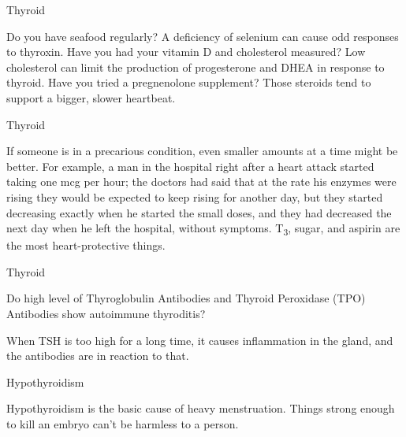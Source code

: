 \documentclass[11pt,oneside,openany,extrafontsizes]{memoir}
\begin{document}
\begin{standalonequote}{Thyroid}

    \begin{answer}
        Do you have seafood regularly? A deficiency of selenium can cause odd responses to thyroxin. Have you had your vitamin D and cholesterol measured? Low cholesterol can limit the production of progesterone and DHEA in response to thyroid. Have you tried a pregnenolone supplement? Those steroids tend to support a bigger, slower heartbeat.
    \end{answer}
\end{standalonequote}

\begin{standalonequote}{Thyroid}

    \begin{answer}
        If someone is in a precarious condition, even smaller amounts at a time might be better. For example, a man in the hospital right after a heart attack started taking one mcg per hour; the doctors had said that at the rate his enzymes were rising they would be expected to keep rising for another day, but they started decreasing exactly when he started the small doses, and they had decreased the next day when he left the hospital, without symptoms. T\textsubscript{3}, sugar, and aspirin are the most heart-protective things.
    \end{answer}
\end{standalonequote}

\begin{qaexchange}{Thyroid}

    \begin{question}
        Do high level of Thyroglobulin Antibodies and Thyroid Peroxidase (TPO) Antibodies show autoimmune thyroditis?
    \end{question}

    \begin{answer}
        When TSH is too high for a long time, it causes inflammation in the gland, and the antibodies are in reaction to that.
    \end{answer}
\end{qaexchange}

\begin{standalonequote}{Hypothyroidism}

    \begin{answer}
      Hypothyroidism is the basic cause of heavy menstruation. Things strong enough to kill an embryo can't be harmless to a person.
    \end{answer}
\end{standalonequote}
\end{document}
